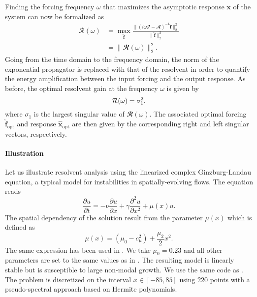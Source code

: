     Finding the forcing frequency $\omega$ that maximizes the asymptotic response $\mathbf{x}$ of the system can now be formalized as
    \begin{equation}
      \begin{aligned}
        \mathcal{R}(\omega) & = \max_{\hat{\mathbf{f}}} \displaystyle \frac{\| \left( i \omega \mathbfcal{I} - \mathbfcal{A} \right)^{-1} \hat{\mathbf{f}} \|_2^2}{\| \hat{\mathbf{f}} \|_2^2} \\
        & = \| \mathbfcal{R}(\omega) \|_2^2.
      \end{aligned}
      \label{eq: theory -- resolvent norm}
    \end{equation}
    Going from the time domain to the frequency domain, the norm of the exponential propagator is replaced with that of the resolvent in order to quantify the energy amplification between the input forcing and the output response. As before, the optimal resolvent gain at the frequency $\omega$ is given by
    \begin{equation}
      \mathcal{R}(\omega) = \sigma_1^2,
      \notag
    \end{equation}
    where $\sigma_1$ is the largest singular value of $\mathbfcal{R}(\omega)$. The associated optimal forcing $\hat{\mathbf{f}}_{\mathrm{opt}}$ and response $\hat{\mathbf{x}}_{\mathrm{opt}}$ are then given by the corresponding right and left singular vectors, respectively.

    \paragraph{Illustration}

    Let us illustrate resolvent analysis using the linearized complex Ginzburg-Landau equation, a typical model for instabilities in spatially-evolving flows. The equation reads
    \begin{equation}
      \displaystyle \frac{\partial u}{\partial t} = \displaystyle -\nu \frac{\partial u}{\partial x} + \gamma \frac{\partial^2 u}{\partial x^2} + \mu(x) u.
      \label{eq: theory -- ginzburg-landau equation}
    \end{equation}
    The spatial dependency of the solution result from the parameter $\mu(x)$ which is defined as
    $$\mu(x) = (\mu_0 - c_{\mu}^2) + \displaystyle \frac{\mu_2}{2} x^2.$$
    The same expression has been used in \cite{prsla:hunt:1991, amr:bagheri:2009, jfm:chen:2011}. We take $\mu_0 = 0.23$ and all other parameters are set to the same values as in \cite{amr:bagheri:2009}. The resulting model is linearly stable but is susceptible to large non-modal growth. We use the same code as \cite{jfm:chen:2011}. The problem is discretized on the interval $x \in \left[ -85, 85 \right]$ using 220 points with a pseudo-spectral approach based on Hermite polynomials.

